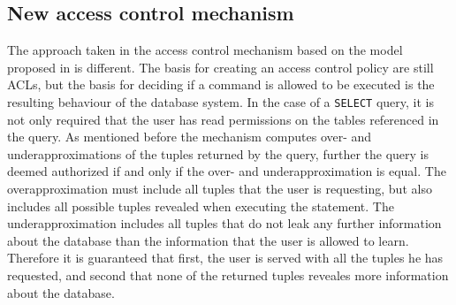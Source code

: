 \subsection{New access control mechanism}
%
The approach taken in the access control mechanism based on the model proposed in\cite{guarnieri2016strong} is different.
%
The basis for creating an access control policy are still ACLs, but the basis for deciding if a command is allowed to be executed is the resulting behaviour of the database system.
%
In the case of a \texttt{SELECT} query, it is not only required that the user has read permissions on the tables referenced in the query.
%
As mentioned before the mechanism computes over- and underapproximations of the tuples returned by the query, further the query is deemed authorized if and only if the over- and underapproximation is equal.
%
The overapproximation must include all tuples that the user is requesting, but also includes all possible tuples revealed when executing the statement.
%
The underapproximation includes all tuples that do not leak any further information about the database than the information that the user is allowed to learn.
%
Therefore it is guaranteed that first, the user is served with all the tuples he has requested, and second that none of the returned tuples reveales more information about the database.